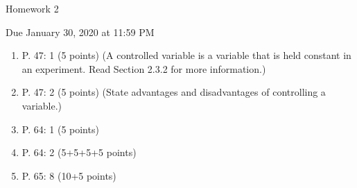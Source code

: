 \documentclass{article}
\begin{document}
\begin{center} \LARGE
Homework 2 
\end{center}
\begin{center} \Large
Due January 30, 2020 at 11:59 PM 
\end{center}



\begin{enumerate}
	\item P. 47: 1 (5 points) (A controlled variable is a variable that is
		held constant in an experiment. Read Section 2.3.2 for more
		information.)
	\item P. 47: 2 (5 points) (State advantages and disadvantages of
		controlling a variable.)
	\item P. 64: 1 (5 points)
	\item P. 64: 2 (5+5+5+5 points)
	\item P. 65: 8 (10+5 points)
\end{enumerate}





% 
%
\end{document}
